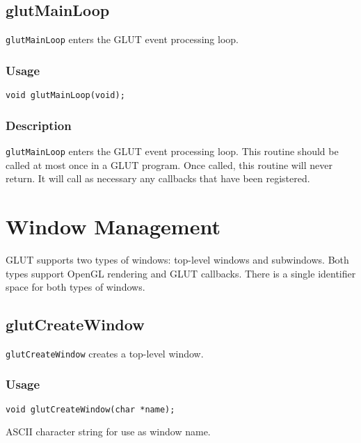\subsection{glutMainLoop}

{\tt glutMainLoop} enters the GLUT event processing loop.

\subsubsection*{Usage}

\begin{verbatim}
void glutMainLoop(void);
\end{verbatim}
 
\subsubsection*{Description}

{\tt glutMainLoop} enters the GLUT event processing loop.
This routine should be called at most once in a GLUT program.  Once called, this routine
will never return.  It will call as necessary any callbacks that have been registered.

\section{Window Management}

GLUT supports two types of windows:  top-level windows and subwindows.
Both types support OpenGL rendering and GLUT callbacks.  There is a
single identifier space for both types of windows.

\subsection{glutCreateWindow}

{\tt glutCreateWindow} creates a top-level window.

\subsubsection*{Usage}
\begin{verbatim}
void glutCreateWindow(char *name);
\end{verbatim}
\begin{description}
\itemsep 0in
\item[\tt name]
ASCII character string for use as window name.
\end{description}

